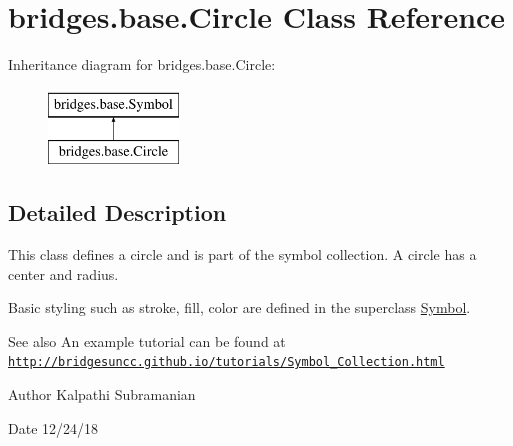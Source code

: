 \hypertarget{classbridges_1_1base_1_1_circle}{}\section{bridges.\+base.\+Circle Class Reference}
\label{classbridges_1_1base_1_1_circle}
Inheritance diagram for bridges.\+base.\+Circle\+:\begin{figure}[H]
\begin{center}
\leavevmode
\includegraphics[height=2.000000cm]{classbridges_1_1base_1_1_circle}
\end{center}
\end{figure}


\subsection{Detailed Description}
This class defines a circle and is part of the symbol collection. A circle has a center and radius. 

Basic styling such as stroke, fill, color are defined in the superclass \hyperlink{classbridges_1_1base_1_1_symbol}{Symbol}.

\begin{DoxySeeAlso}{See also}
An example tutorial can be found at \href{http://bridgesuncc.github.io/tutorials/Symbol_Collection.html}{\tt http\+://bridgesuncc.\+github.\+io/tutorials/\+Symbol\+\_\+\+Collection.\+html}
\end{DoxySeeAlso}
\begin{DoxyAuthor}{Author}
Kalpathi Subramanian 
\end{DoxyAuthor}
\begin{DoxyDate}{Date}
12/24/18 
\end{DoxyDate}
